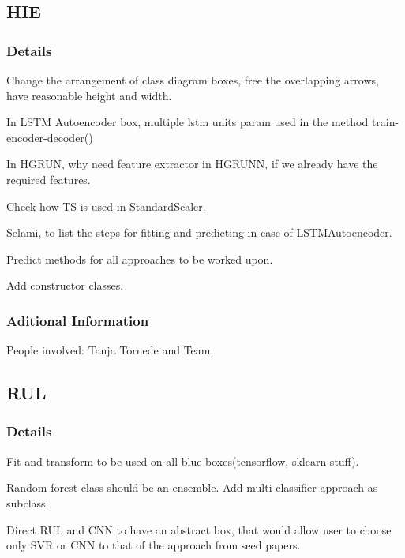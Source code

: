 \documentclass[11pt]{meetingmins} %
\begin{document}
\subsection{HIE}
\subsubsection{Details}
\begin{hiddensubitems}
    \item Change the arrangement of class diagram boxes, free the overlapping arrows, have reasonable height and width.
    \item In LSTM Autoencoder box, multiple lstm units param used in the method train-encoder-decoder()
    \item In HGRUN, why need feature extractor in HGRUNN, if we already have the required features.
    \item Check how TS is used in StandardScaler.
    \item Selami, to list the steps for fitting and predicting in case of LSTMAutoencoder.
    \item Predict methods for all approaches to be worked upon.
    \item Add constructor classes.
\end{hiddensubitems}
\subsubsection{Aditional Information}
\begin{hiddensubitems}
    \item People involved: Tanja Tornede and Team.
\end{hiddensubitems}

\subsection{RUL}
\subsubsection{Details}
\begin{hiddensubitems}
    \item Fit and transform to be used on all blue boxes(tensorflow, sklearn stuff).
    \item Random forest class should be an ensemble. Add multi classifier approach as subclass.
    \item Direct RUL and CNN to have an abstract box, that would allow user to choose only SVR or CNN to that of the approach from seed papers.
\end{hiddensubitems}
\end{document}
